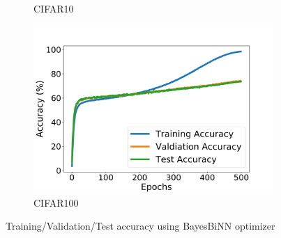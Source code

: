 \begin{figure}[h]
\begin{subfigure}[b]{0.3\textwidth}
         \caption{CIFAR10}
     \end{subfigure}
     \hfill
     \begin{subfigure}[b]{0.3\textwidth}
         \centering
         \includegraphics[width=1.2\textwidth]{../openreview/figs/CIFAR100.png}
         \caption{CIFAR100}
     \end{subfigure}
        \caption{Training/Validation/Test accuracy using BayesBiNN optimizer}
\end{figure}

